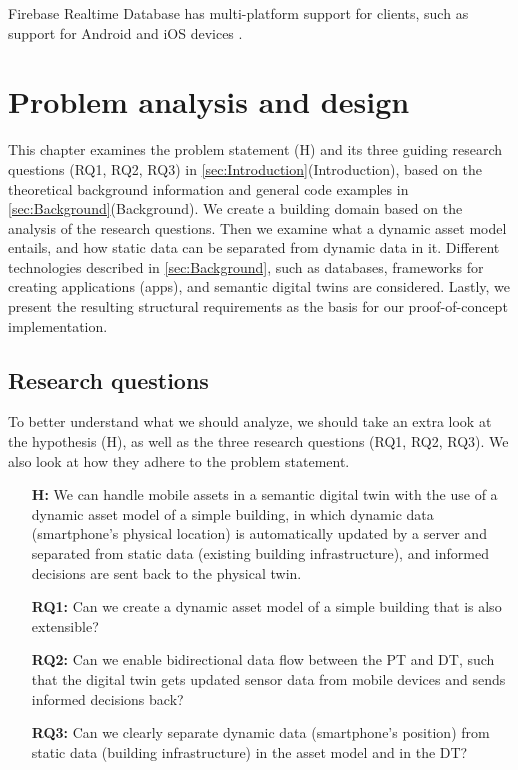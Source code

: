 \documentclass{article}
\begin{document}
Firebase Realtime Database has multi-platform support for clients, such as support for Android and iOS devices \cite{noauthor_firebase_nodate}.



\newpage
\section{Problem analysis and design}\label{sec:Analysis}
This chapter examines the problem statement (H) and its three guiding research questions (RQ1, RQ2, RQ3) in \ref{sec:Introduction}(Introduction), based on the theoretical background information and general code examples in \ref{sec:Background}(Background). We create a building domain based on the analysis of the research questions. Then we examine what a dynamic asset model entails, and how static data can be separated from dynamic data in it. Different technologies described in \ref{sec:Background}, such as databases, frameworks for creating applications (apps), and semantic digital twins are considered. Lastly, we present the resulting structural requirements as the basis for our proof-of-concept implementation.

\subsection{Research questions}
To better understand what we should analyze, we should take an extra look at the hypothesis (H), as well as the three research questions (RQ1, RQ2, RQ3). We also look at how they adhere to the problem statement.

\begin{itemize}
    \item[\textbf{H:}] We can handle mobile assets in a semantic digital twin with the use of a dynamic asset model of a simple building, in which dynamic data (smartphone's physical location) is automatically updated by a server and separated from static data (existing building infrastructure), and informed decisions are sent back to the physical twin.
    \item[\textbf{RQ1:}]
    Can we create a dynamic asset model of a simple building that is also extensible?
    \item [\textbf{RQ2:}] 
    Can we enable bidirectional data flow between the PT and DT, such that the digital twin gets updated sensor data from mobile devices and sends informed decisions back?
    \item [\textbf{RQ3:}]
    Can we clearly separate dynamic data (smartphone's position) from static data (building infrastructure) in the asset model and in the DT?
\end{itemize} 
\end{document}
